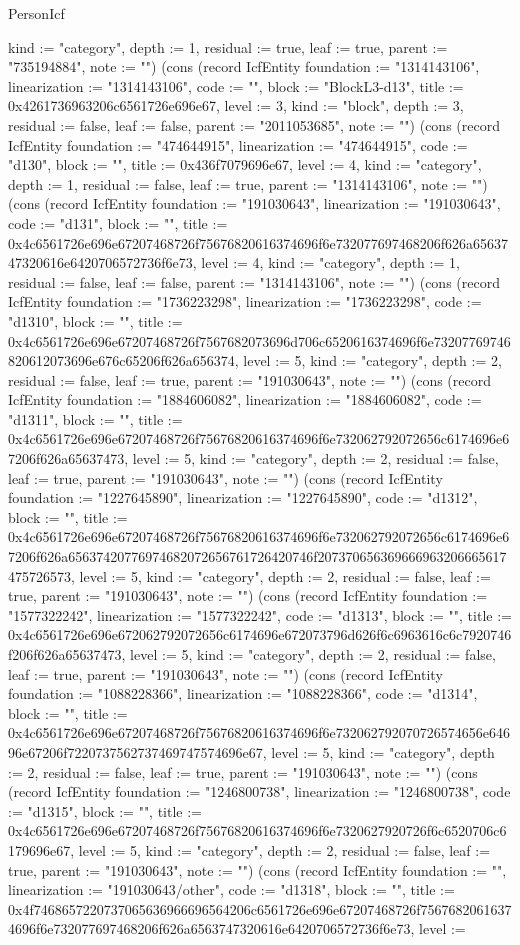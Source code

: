 \begin{lexlean}{PersonIcf}
\begin{semanticmodule}
{kind := "category", depth := 1, residual := true, leaf := true, parent := "735194884", note := ""}) (cons (record IcfEntity {foundation := "1314143106", linearization := "1314143106", code := "", block := "BlockL3-d13", title := 0x4261736963206c6561726e696e67, level := 3, kind := "block", depth := 3, residual := false, leaf := false, parent := "2011053685", note := ""}) (cons (record IcfEntity {foundation := "474644915", linearization := "474644915", code := "d130", block := "", title := 0x436f7079696e67, level := 4, kind := "category", depth := 1, residual := false, leaf := true, parent := "1314143106", note := ""}) (cons (record IcfEntity {foundation := "191030643", linearization := "191030643", code := "d131", block := "", title := 0x4c6561726e696e67207468726f75676820616374696f6e732077697468206f626a6563747320616e6420706572736f6e73, level := 4, kind := "category", depth := 1, residual := false, leaf := false, parent := "1314143106", note := ""}) (cons (record IcfEntity {foundation := "1736223298", linearization := "1736223298", code := "d1310", block := "", title := 0x4c6561726e696e67207468726f7567682073696d706c6520616374696f6e73207769746820612073696e676c65206f626a656374, level := 5, kind := "category", depth := 2, residual := false, leaf := true, parent := "191030643", note := ""}) (cons (record IcfEntity {foundation := "1884606082", linearization := "1884606082", code := "d1311", block := "", title := 0x4c6561726e696e67207468726f75676820616374696f6e732062792072656c6174696e67206f626a65637473, level := 5, kind := "category", depth := 2, residual := false, leaf := true, parent := "191030643", note := ""}) (cons (record IcfEntity {foundation := "1227645890", linearization := "1227645890", code := "d1312", block := "", title := 0x4c6561726e696e67207468726f75676820616374696f6e732062792072656c6174696e67206f626a65637420776974682072656761726420746f207370656369666963206665617475726573, level := 5, kind := "category", depth := 2, residual := false, leaf := true, parent := "191030643", note := ""}) (cons (record IcfEntity {foundation := "1577322242", linearization := "1577322242", code := "d1313", block := "", title := 0x4c6561726e696e672062792072656c6174696e672073796d626f6c6963616c6c7920746f206f626a65637473, level := 5, kind := "category", depth := 2, residual := false, leaf := true, parent := "191030643", note := ""}) (cons (record IcfEntity {foundation := "1088228366", linearization := "1088228366", code := "d1314", block := "", title := 0x4c6561726e696e67207468726f75676820616374696f6e732062792070726574656e64696e67206f7220737562737469747574696e67, level := 5, kind := "category", depth := 2, residual := false, leaf := true, parent := "191030643", note := ""}) (cons (record IcfEntity {foundation := "1246800738", linearization := "1246800738", code := "d1315", block := "", title := 0x4c6561726e696e67207468726f75676820616374696f6e7320627920726f6c6520706c6179696e67, level := 5, kind := "category", depth := 2, residual := false, leaf := true, parent := "191030643", note := ""}) (cons (record IcfEntity {foundation := "", linearization := "191030643/other", code := "d1318", block := "", title := 0x4f7468657220737065636966696564206c6561726e696e67207468726f75676820616374696f6e732077697468206f626a6563747320616e6420706572736f6e73, level := }
\end{semanticmodule}
\end{lexlean}
